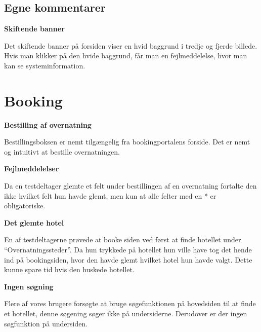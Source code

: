 \documentclass[10pt,a4paper]{article}      %
\newcommand\pic[1]{\texttt{[image: Pics/\#1]}}
\renewcommand\good{\pic{good}}
\renewcommand\goodidea{\pic{goodidea}}
\renewcommand\smallproblem{\pic{smallproblem}}
\renewcommand\seriousproblem{\pic{seriousproblem}}
\begin{document}
\subsection{Egne kommentarer} %
\label{sub:Egne kommentarer forsiden}

\begin{kommentarer}
  \item[\seriousproblem]{\textbf{Skiftende banner}}

  Det skiftende banner på forsiden viser en hvid baggrund i tredje og fjerde
  billede. Hvis man klikker på den hvide baggrund, får man en fejlmeddelelse,
  hvor man kan se systeminformation.
\end{kommentarer}


\section{Booking}
\begin{kommentarer}
\item[\good]{\textbf{Bestilling af overnatning}}

Bestillingsboksen er nemt tilgængelig fra bookingportalens forside. Det er nemt og intuitivt at bestille overnatningen.

\item[\smallproblem]{\textbf{Fejlmeddelelser}}

Da en testdeltager glemte et felt under bestillingen af en overnatning fortalte den ikke hvilket felt hun havde glemt, men kun at alle felter med en * er obligatoriske.

\item[\goodidea]{\textbf{Det glemte hotel}}

En af testdeltagerne prøvede at booke siden ved først at finde hotellet under ``Overnatningssteder''. Da hun trykkede på hotellet hun ville have tog det hende ind på bookingsiden, hvor den havde glemt hvilket hotel hun havde valgt. Dette kunne spare tid hvis den huskede hotellet.

\item[\seriousproblem]{\textbf{Ingen søgning}}

Flere af vores brugere forsøgte at bruge søgefunktionen på hovedsiden til at finde et hotellet, denne søgening søger ikke på undersiderne. Derudover er der ingen søgfunktion på undersiden.

\end{kommentarer}
\end{document}
